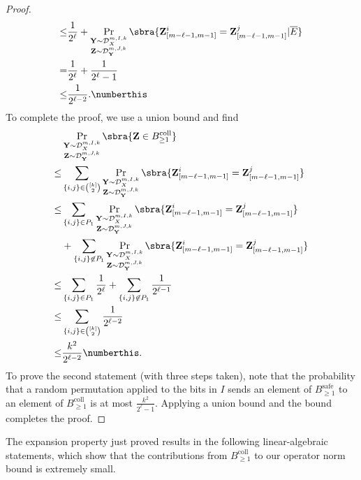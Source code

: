 \begin{proof}
\begin{align*}
        \leq& \frac1{2^\ell} + \Pr_{\substack{\mathbf{Y}\sim \mathcal{D}_{X}^{m,I,k}\\\mathbf{Z}\sim\mathcal{D}_{\mathbf{Y}}^{m,J,k}}}\sbra{\mathbf{Z}^i_{[m-\ell-1,m-1]}=\mathbf{Z}^j_{[m-\ell-1,m-1]}|\overline{E}}\\
        =& \frac1{2^\ell}+\frac1{2^\ell-1}\\
        \leq&\frac1{2^{\ell-2}}.\numberthis\label{eq:not P1 contribution}
    \end{align*}
    To complete the proof, we use a union bound and find
    \begin{align*}
        &\Pr_{\substack{\mathbf{Y}\sim \mathcal{D}_{X}^{m,I,k}\\\mathbf{Z}\sim\mathcal{D}_{\mathbf{Y}}^{m,J,k}}}\sbra{\mathbf{Z}\in B_{\geq1}^{\mathrm{coll}}}\\
        \leq& \sum_{\{i,j\}\in\binom{[k]}{2}}\Pr_{\substack{\mathbf{Y}\sim \mathcal{D}_{X}^{m,I,k}\\\mathbf{Z}\sim\mathcal{D}_{\mathbf{Y}}^{m,J,k}}}\sbra{\mathbf{Z}^i_{[m-\ell-1,m-1]}=\mathbf{Z}^j_{[m-\ell-1,m-1]}}\\
        \leq&\sum_{\{i,j\}\in P_1}\Pr_{\substack{\mathbf{Y}\sim \mathcal{D}_{X}^{m,I,k}\\\mathbf{Z}\sim\mathcal{D}_{\mathbf{Y}}^{m,J,k}}}\sbra{\mathbf{Z}^i_{[m-\ell-1,m-1]}=\mathbf{Z}^j_{[m-\ell-1,m-1]}}\\
        &+\sum_{\{i,j\}\not\in P_1}\Pr_{\substack{\mathbf{Y}\sim \mathcal{D}_{X}^{m,I,k}\\\mathbf{Z}\sim\mathcal{D}_{\mathbf{Y}}^{m,J,k}}}\sbra{\mathbf{Z}^i_{[m-\ell-1,m-1]}=\mathbf{Z}^j_{[m-\ell-1,m-1]}}\\
        \leq& \sum_{\{i,j\}\in P_1}\frac1{2^{\ell}}+\sum_{\{i,j\}\not\in P_1}\frac1{2^{\ell-1}}\\
        \leq&\sum_{\{i,j\}\in \binom{[k]}{2}}\frac1{2^{\ell-2}}\\
        \leq& \frac{k^2}{2^{\ell-2}}\numberthis\label{eq:two step bound}.
    \end{align*}
    To prove the second statement (with three steps taken), note that the probability that a random permutation applied to the bits in $I$ sends an element of $B_{\geq1}^{\mathrm{safe}}$ to an element of $B_{\geq1}^{\mathrm{coll}}$ is at most $\frac{k^2}{2^{\ell}-1}$. Applying a union bound and the bound  completes the proof.
\end{proof}


The expansion property just proved results in the following linear-algebraic statements, which show that the contributions from $B_{\geq1}^{\mathrm{coll}}$ to our operator norm bound is extremely small.


